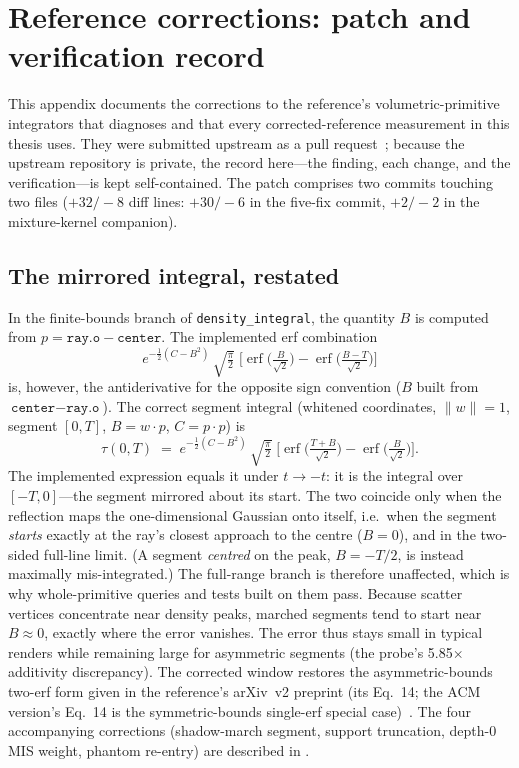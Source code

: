 \chapter{Reference corrections: patch and verification record}
\label{app:corrections}

This appendix documents the corrections to the reference's volumetric-primitive
integrators that  diagnoses and that every corrected-reference
measurement in this thesis uses. They were submitted upstream as a pull
request~\cite{KramarzVolprimFixes2026}; because the upstream repository is private, the
record here---the finding, each change, and the verification---is kept self-contained.
The patch comprises two commits touching two files ($+32/-8$ diff lines: $+30/-6$ in the
five-fix commit, $+2/-2$ in the mixture-kernel companion).

\section{The mirrored integral, restated}
\label{app:corrections-claim}

In the finite-bounds branch of \texttt{density\_integral}, the quantity $B$ is computed from
$p = \texttt{ray.o} - \texttt{center}$. The implemented erf combination
\[
e^{-\frac{1}{2}(C-B^2)}\,\sqrt{\tfrac{\pi}{2}}\;
\Big[\operatorname{erf}\!\Big(\tfrac{B}{\sqrt{2}}\Big) -
     \operatorname{erf}\!\Big(\tfrac{B-T}{\sqrt{2}}\Big)\Big]
\]
is, however, the antiderivative for the opposite sign convention ($B$ built from
$\texttt{center} - \texttt{ray.o}$). The correct segment integral (whitened coordinates,
$\lVert w\rVert = 1$, segment $[0,T]$, $B = w\cdot p$, $C = p\cdot p$) is
\[
\tau(0,T) \;=\; e^{-\frac{1}{2}(C-B^2)}\,\sqrt{\tfrac{\pi}{2}}\;
\Big[\operatorname{erf}\!\Big(\tfrac{T+B}{\sqrt{2}}\Big) -
     \operatorname{erf}\!\Big(\tfrac{B}{\sqrt{2}}\Big)\Big].
\]
The implemented expression equals it under $t \to -t$: it is the integral over $[-T,0]$---the
segment mirrored about its start. The two coincide only when the reflection maps the
one-dimensional Gaussian onto itself, i.e.\ when the segment \emph{starts} exactly at the
ray's closest approach to the centre ($B = 0$), and in the two-sided full-line limit. (A
segment \emph{centred} on the peak, $B=-T/2$, is instead maximally mis-integrated.) The
full-range branch is therefore unaffected, which is why whole-primitive queries and tests
built on them pass. Because scatter vertices concentrate near density peaks, marched
segments tend to start near $B\approx 0$, exactly where the error vanishes. The error thus
stays small in typical renders while remaining large for asymmetric segments (the probe's
\num{5.85}$\times$ additivity discrepancy). The corrected window
restores the asymmetric-bounds two-erf form given in the reference's arXiv~v2 preprint (its
Eq.~14; the ACM version's Eq.~14 is the symmetric-bounds single-erf special case)~\cite{DSYG}. The four
accompanying corrections (shadow-march segment, support truncation, depth-0 MIS weight, phantom
re-entry) are described in .

